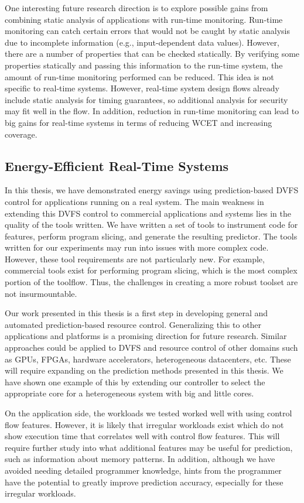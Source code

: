 One interesting future research direction is to explore possible gains from
combining static analysis of applications with run-time monitoring. Run-time
monitoring can catch certain errors that would not be caught by static analysis
due to incomplete information (e.g., input-dependent data values). However,
there are a number of properties that can be checked statically. 
By verifying some properties statically and passing this information to the
run-time system, the amount of run-time monitoring performed can be reduced.
This idea is not specific to real-time systems. However, real-time system
design flows already include static analysis for timing guarantees, so
additional analysis for security may fit well in the flow. In addition,
reduction in run-time monitoring can lead to big gains for real-time systems in
terms of reducing WCET and increasing coverage.

\subsection{Energy-Efficient Real-Time Systems}

In this thesis, we have demonstrated energy savings using prediction-based DVFS
control for applications running on a real system.  The main weakness in
extending this DVFS control to commercial applications and systems lies in the
quality of the tools written. We have written a set of tools to instrument code
for features, perform program slicing, and generate the resulting predictor.
The tools written for our experiments may run into issues with more complex
code. However, these tool requirements are not particularly new. For
example, commercial tools exist for performing program slicing, which is the
most complex portion of the toolflow. Thus, the challenges in creating a more
robust toolset are not insurmountable. 

Our work presented in this thesis is a first step in developing general and
automated prediction-based resource control. Generalizing this to other
applications and platforms is a promising direction for future research.
Similar approaches could be applied to DVFS and resource control of other
domains such as GPUs, FPGAs, hardware accelerators, heterogeneous datacenters,
etc. These will require expanding on the prediction methods presented in this
thesis. We have shown one example of this by extending our controller to select
the appropriate core for a heterogeneous system with big and little cores.

On the application side, the workloads we tested worked well with using control
flow features. However, it is likely that irregular workloads exist which do
not show execution time that correlates well with control flow features. This
will require further study into what additional features may be useful for
prediction, such as information about memory patterns. In addition, although we
have avoided needing detailed programmer knowledge, hints from the programmer
have the potential to greatly improve prediction accuracy, especially for
these irregular workloads.

